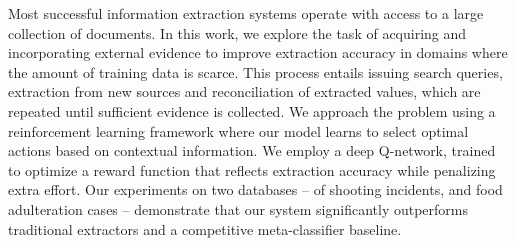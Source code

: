 Most successful information extraction systems operate with access to a large collection of documents. In this work, we explore the task of acquiring and incorporating external evidence to improve extraction accuracy in domains where the amount of training data is scarce. This process entails issuing search queries, extraction from new sources and reconciliation of extracted values, which are repeated until sufficient evidence is collected. We approach the problem using a reinforcement learning framework where our model learns to select optimal actions based on contextual information. We employ a deep Q-network, trained to optimize a reward function that reflects extraction accuracy while penalizing extra effort. Our experiments on two databases -- of shooting incidents, and food adulteration cases -- demonstrate that our system significantly outperforms traditional extractors and a competitive meta-classifier baseline.
